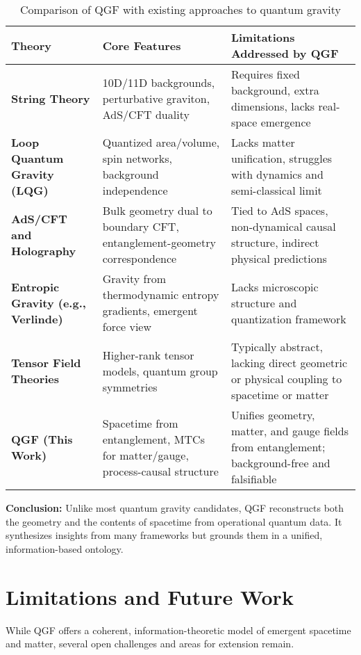 \documentclass[11pt]{article}
\begin{document}
\begin{table}[h!]
\centering
\begin{tabular}{|p{4cm}|p{5.5cm}|p{5.5cm}|}
\hline
\textbf{Theory} & \textbf{Core Features} & \textbf{Limitations Addressed by QGF} \\
\hline
\textbf{String Theory} & 
10D/11D backgrounds, perturbative graviton, AdS/CFT duality & 
Requires fixed background, extra dimensions, lacks real-space emergence \\
\hline
\textbf{Loop Quantum Gravity (LQG)} & 
Quantized area/volume, spin networks, background independence & 
Lacks matter unification, struggles with dynamics and semi-classical limit \\
\hline
\textbf{AdS/CFT and Holography} & 
Bulk geometry dual to boundary CFT, entanglement-geometry correspondence & 
Tied to AdS spaces, non-dynamical causal structure, indirect physical predictions \\
\hline
\textbf{Entropic Gravity (e.g., Verlinde)} & 
Gravity from thermodynamic entropy gradients, emergent force view & 
Lacks microscopic structure and quantization framework \\
\hline
\textbf{Tensor Field Theories} & 
Higher-rank tensor models, quantum group symmetries & 
Typically abstract, lacking direct geometric or physical coupling to spacetime or matter \\
\hline
\textbf{QGF (This Work)} & 
Spacetime from entanglement, MTCs for matter/gauge, process-causal structure & 
Unifies geometry, matter, and gauge fields from entanglement; background-free and falsifiable \\
\hline
\end{tabular}
\caption{Comparison of QGF with existing approaches to quantum gravity}
\end{table}

\textbf{Conclusion:} Unlike most quantum gravity candidates, QGF reconstructs both the geometry and the contents of spacetime from operational quantum data. It synthesizes insights from many frameworks but grounds them in a unified, information-based ontology.



\section{Limitations and Future Work}

While QGF offers a coherent, information-theoretic model of emergent spacetime and matter, several open challenges and areas for extension remain.
\end{document}
